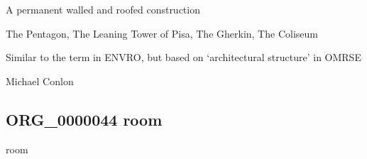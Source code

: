 \documentclass[letterpaper,10pt,english]{sphinxmanual}
\begin{document}
\begin{sphinxShadowBox}

\sphinxAtStartPar
A permanent walled and roofed construction
\end{sphinxShadowBox}

\begin{sphinxShadowBox}

\sphinxAtStartPar
{}
\end{sphinxShadowBox}

\begin{sphinxShadowBox}

\sphinxAtStartPar
The Pentagon, The Leaning Tower of Pisa, The Gherkin, The Coliseum
\end{sphinxShadowBox}

\begin{sphinxShadowBox}

\sphinxAtStartPar
Similar to the term in ENVRO, but based on ‘architectural structure’ in OMRSE
\end{sphinxShadowBox}

\begin{sphinxShadowBox}

\sphinxAtStartPar
Michael Conlon 
\end{sphinxShadowBox}

\begin{sphinxShadowBox}

\sphinxAtStartPar
{}
\end{sphinxShadowBox}
\begin{quote}

\ignorespaces \end{quote}


\subsection{ORG\_0000044 \sphinxhyphen{} room}
\label{\detokenize{doc-ORG_0000044:org-0000044-room}}\label{\detokenize{doc-ORG_0000044:index-0}}\label{\detokenize{doc-ORG_0000044::doc}}
\begin{sphinxShadowBox}

\sphinxAtStartPar
room
\end{sphinxShadowBox}
\end{document}
